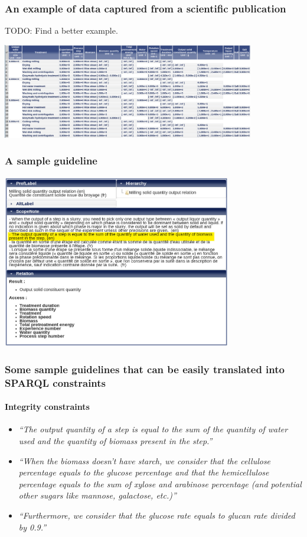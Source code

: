 \documentclass{beamer}
\begin{document}
\begin{frame}
  \frametitle{An example of data captured from a scientific publication}

  TODO: Find a better example.

  \begin{center}
    \includegraphics[width=11cm]{table.jpg}
  \end{center}
\end{frame}

\begin{frame}
  \frametitle{A sample guideline}

  \begin{center}
    \includegraphics[width=10cm]{guideline.jpg}
  \end{center}
\end{frame}

\begin{frame}
  \frametitle{Some sample guidelines that can be easily translated into SPARQL
  constraints}
  \framesubtitle{Integrity constraints}

  \begin{itemize}
    \item \textit{``The output quantity of a step is equal to the sum of the
      quantity of water used and the quantity of biomass present in the
    step.''}

    \pause

    \item \textit{``When the biomass doesn't have starch, we consider that the
      cellulose percentage equals to the glucose percentage and that the
    hemicellulose percentage equals to the sum of xylose and arabinose
  percentage (and potential other sugars like mannose, galactose, etc.)''}

    \pause

    \item \textit{``Furthermore, we consider that the glucose rate equals to
      glucan rate divided by 0.9.''}
  \end{itemize}
\end{frame}
\end{document}
